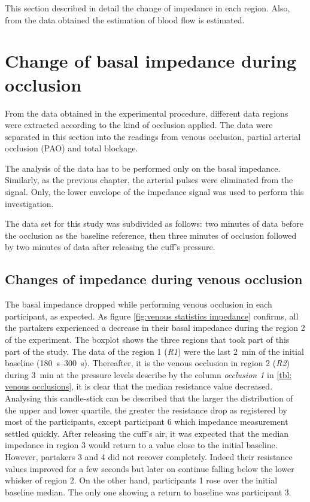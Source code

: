 This section described in detail the change of impedance in each region. Also, from the data obtained the estimation of blood flow is estimated.

\section{Change of basal impedance during occlusion}
\label{section occlusion 1}
From the data obtained in the experimental procedure, different data regions were extracted according to the kind of occlusion applied. The data were separated in this section into the readings from venous occlusion, partial arterial occlusion (PAO) and total blockage. 

The analysis of the data has to be performed only on the basal impedance. Similarly, as the previous chapter, the arterial pulses were eliminated from the signal. Only, the lower envelope of the impedance signal was used to perform this investigation. 

The data set for this study was subdivided as follows: two minutes of data before the occlusion as the baseline reference, then three minutes of occlusion followed by two minutes of data after releasing the cuff's pressure. 

\subsection{Changes of impedance during venous occlusion}
\label{section occlusion 1.1}
The basal impedance dropped while performing venous occlusion in each participant, as expected. As figure \ref{fig:venous statistics impedance} confirms, all the partakers experienced a decrease in their basal impedance during the region 2 of the experiment. The boxplot shows the three regions that took part of this part of the study. The data of the region 1 (\textit{R1}) were the last \SI{2}{\minute} of the initial baseline (\SIrange{180}{300}{\second}). Thereafter, it is the venous occlusion in region 2 (\textit{R2}) during \SI{3}{\minute} at the pressure levels describe by the column \textit{occlusion 1} in \ref{tbl: venous occlusions}, it is clear that the median resistance value decreased. Analysing this candle-stick can be described that the larger the distribution of the upper and lower quartile, the greater the resistance drop as registered by most of the participants, except participant 6 which impedance measurement settled quickly. After releasing the cuff's air, it was expected that the median impedance in region 3 would return to a value close to the initial baseline. However, partakers 3 and 4 did not recover completely. Indeed their resistance values improved for a few seconds but later on continue falling below the lower whisker of region 2. On the other hand, participants 1 rose over the initial baseline median. The only one showing a return to baseline was participant 3. 

